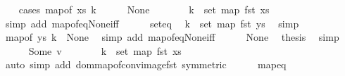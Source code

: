 \begin{isabellebody}
\ \ \isamarkupfalse%
\ {\isacharparenleft}{\kern0pt}cases\ {\isachardoublequoteopen}map{\isacharunderscore}{\kern0pt}of\ xs\ k{\isachardoublequoteclose}{\isacharparenright}{\kern0pt}\isanewline
\ \ \ \ \isamarkupfalse%
\ None\isanewline
\ \ \ \ \isamarkupfalse%
\ \isamarkupfalse%
\ {\isachardoublequoteopen}k\ {\isasymnotin}\ set\ {\isacharparenleft}{\kern0pt}map\ fst\ xs{\isacharparenright}{\kern0pt}{\isachardoublequoteclose}\ \isamarkupfalse%
\ {\isacharparenleft}{\kern0pt}simp\ add{\isacharcolon}{\kern0pt}\ map{\isacharunderscore}{\kern0pt}of{\isacharunderscore}{\kern0pt}eq{\isacharunderscore}{\kern0pt}None{\isacharunderscore}{\kern0pt}iff{\isacharparenright}{\kern0pt}\isanewline
\ \ \ \ \isamarkupfalse%
\ set{\isacharunderscore}{\kern0pt}eq\ \isamarkupfalse%
\ {\isachardoublequoteopen}k\ {\isasymnotin}\ set\ {\isacharparenleft}{\kern0pt}map\ fst\ ys{\isacharparenright}{\kern0pt}{\isachardoublequoteclose}\ \isamarkupfalse%
\ simp\isanewline
\ \ \ \ \isamarkupfalse%
\ \isamarkupfalse%
\ {\isachardoublequoteopen}map{\isacharunderscore}{\kern0pt}of\ ys\ k\ {\isacharequal}{\kern0pt}\ None{\isachardoublequoteclose}\ \isamarkupfalse%
\ {\isacharparenleft}{\kern0pt}simp\ add{\isacharcolon}{\kern0pt}\ map{\isacharunderscore}{\kern0pt}of{\isacharunderscore}{\kern0pt}eq{\isacharunderscore}{\kern0pt}None{\isacharunderscore}{\kern0pt}iff{\isacharparenright}{\kern0pt}\isanewline
\ \ \ \ \isamarkupfalse%
\ None\ \isamarkupfalse%
\ {\isacharquery}{\kern0pt}thesis\ \isamarkupfalse%
\ simp\isanewline
\ \ \isamarkupfalse%
\isanewline
\ \ \ \ \isamarkupfalse%
\ {\isacharparenleft}{\kern0pt}Some\ v{\isacharparenright}{\kern0pt}\isanewline
\ \ \ \ \isamarkupfalse%
\ \isamarkupfalse%
\ {\isachardoublequoteopen}k\ {\isasymin}\ set\ {\isacharparenleft}{\kern0pt}map\ fst\ xs{\isacharparenright}{\kern0pt}{\isachardoublequoteclose}\ \isamarkupfalse%
\ {\isacharparenleft}{\kern0pt}auto\ simp\ add{\isacharcolon}{\kern0pt}\ dom{\isacharunderscore}{\kern0pt}map{\isacharunderscore}{\kern0pt}of{\isacharunderscore}{\kern0pt}conv{\isacharunderscore}{\kern0pt}image{\isacharunderscore}{\kern0pt}fst\ {\isacharbrackleft}{\kern0pt}symmetric{\isacharbrackright}{\kern0pt}{\isacharparenright}{\kern0pt}\isanewline
\ \ \ \ \isamarkupfalse%
\ map{\isacharunderscore}{\kern0pt}eq\ \isamarkupfalse%

\end{isabellebody}

